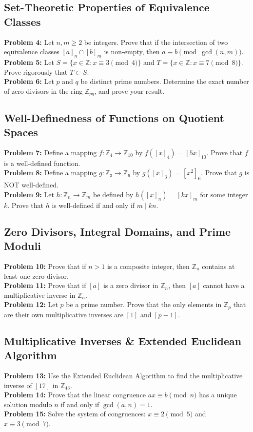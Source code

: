 \documentclass[11pt, a4paper]{article}
\theoremstyle{definition}
\theoremstyle{remark}
\newcommand{\Z}{\mathbb{Z}}
\begin{document}
\subsection{Set-Theoretic Properties of Equivalence Classes}
\textbf{Problem 4:} Let $n, m \ge 2$ be integers. Prove that if the intersection of two equivalence classes $[a]_n \cap [b]_m$ is non-empty, then $a \equiv b \pmod{\gcd(n,m)}$. \\
\textbf{Problem 5:} Let $S = \{x \in \Z : x \equiv 3 \pmod 4\}$ and $T = \{x \in \Z : x \equiv 7 \pmod 8\}$. Prove rigorously that $T \subset S$. \\
\textbf{Problem 6:} Let $p$ and $q$ be distinct prime numbers. Determine the exact number of zero divisors in the ring $\Z_{pq}$, and prove your result.

\subsection{Well-Definedness of Functions on Quotient Spaces}
\textbf{Problem 7:} Define a mapping $f: \Z_4 \to \Z_{10}$ by $f([x]_4) = [5x]_{10}$. Prove that $f$ is a well-defined function. \\
\textbf{Problem 8:} Define a mapping $g: \Z_3 \to \Z_6$ by $g([x]_3) = [x^2]_6$. Prove that $g$ is NOT well-defined. \\
\textbf{Problem 9:} Let $h: \Z_n \to \Z_m$ be defined by $h([x]_n) = [kx]_m$ for some integer $k$. Prove that $h$ is well-defined if and only if $m \mid kn$.

\subsection{Zero Divisors, Integral Domains, and Prime Moduli}
\textbf{Problem 10:} Prove that if $n > 1$ is a composite integer, then $\Z_n$ contains at least one zero divisor. \\
\textbf{Problem 11:} Prove that if $[a]$ is a zero divisor in $\Z_n$, then $[a]$ cannot have a multiplicative inverse in $\Z_n$. \\
\textbf{Problem 12:} Let $p$ be a prime number. Prove that the only elements in $\Z_p$ that are their own multiplicative inverses are $[1]$ and $[p-1]$.

\subsection{Multiplicative Inverses \& Extended Euclidean Algorithm}
\textbf{Problem 13:} Use the Extended Euclidean Algorithm to find the multiplicative inverse of $[17]$ in $\Z_{43}$. \\
\textbf{Problem 14:} Prove that the linear congruence $ax \equiv b \pmod n$ has a unique solution modulo $n$ if and only if $\gcd(a,n) = 1$. \\
\textbf{Problem 15:} Solve the system of congruences: $x \equiv 2 \pmod 5$ and $x \equiv 3 \pmod 7$.
\end{document}

